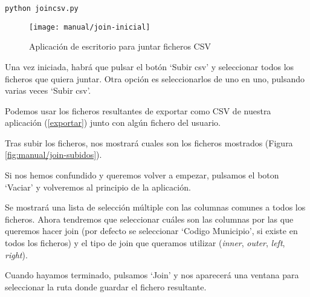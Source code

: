 \begin{lstlisting}
python joincsv.py
\end{lstlisting}

\begin{figure}[!h]
	\centering
	\texttt{[image: manual/join-inicial]}
	\caption{Aplicación de escritorio para juntar ficheros CSV}
	\label{fig:manual/join-inicial}
\end{figure}
\FloatBarrier

Una vez iniciada, habrá que pulsar el botón `Subir csv' y seleccionar todos los ficheros que quiera juntar. Otra opción es seleccionarlos de uno en uno, pulsando varias veces `Subir csv'.

Podemos usar los ficheros resultantes de exportar como CSV de nuestra aplicación (\ref{exportar}) junto con algún fichero del usuario.

Tras subir los ficheros, nos mostrará cuales son los ficheros mostrados (Figura \ref{fig:manual/join-subidos}).


Si nos hemos confundido y queremos volver a empezar, pulsamos el boton `Vaciar' y volveremos al principio de la aplicación.

Se mostrará una lista de selección múltiple con las columnas comunes a todos los ficheros. Ahora tendremos que seleccionar cuáles son las columnas por las que queremos hacer join (por defecto se seleccionar `Codigo Municipio', si existe en todos los ficheros) y el tipo de join que queramos utilizar (\textit{inner}, \textit{outer}, \textit{left}, \textit{right}).

Cuando hayamos terminado, pulsamos `Join' y nos aparecerá una ventana para seleccionar la ruta donde guardar el fichero resultante.

